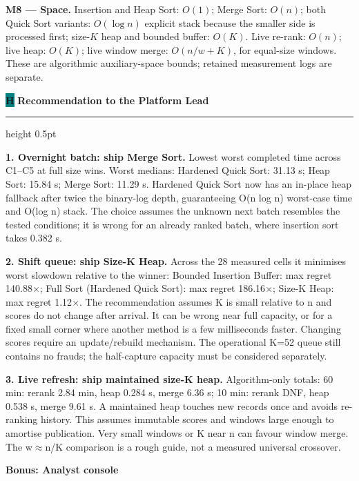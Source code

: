 \documentclass[10pt,a4paper]{article}
\newcommand{\sectiontitle}[2]{%
  \par\addvspace{4pt}%
  \noindent
  {\setlength{\fboxsep}{2.7pt}%
   \colorbox{teal}{\color{white}\fontsize{8.4}{9}\selectfont\bfseries #1}}%
  \hspace{5pt}%
  {\fontsize{12.2}{14}\selectfont\bfseries #2}%
  \par\vspace{1.6pt}%
  {\color{teal!40}\hrule height 0.5pt}%
  \par\vspace{2pt}%
}
\newcommand{\subheading}[1]{%
  \par\addvspace{3pt}%
  \noindent{\color{teal}\rule[-1.4pt]{2.6pt}{9pt}}\hspace{5pt}%
  {\fontsize{9.2}{11}\selectfont\bfseries #1}%
  \par\vspace{1pt}%
}
\begin{document}
\textbf{M8 --- Space.} Insertion and Heap Sort: \(O(1)\);
    Merge Sort: \(O(n)\); both Quick Sort variants: \(O(\log n)\) explicit
    stack because the smaller side is processed first; size-\(K\) heap and
    bounded buffer: \(O(K)\). Live re-rank: \(O(n)\);
    live heap: \(O(K)\); live window merge: \(O(n/w+K)\), for equal-size windows.
    These are algorithmic auxiliary-space bounds; retained measurement logs are separate.\par

\sectiontitle{H}{Recommendation to the Platform Lead}

\textbf{1. Overnight batch: ship Merge Sort.} Lowest worst completed time
across C1--C5 at full size wins. Worst medians: Hardened Quick Sort: 31.13 s;
Heap Sort: 15.84 s; Merge Sort: 11.29 s. Hardened Quick Sort now has an
in-place heap fallback after twice the binary-log depth, guaranteeing
O(n log n) worst-case time and O(log n) stack. The choice assumes the unknown
next batch resembles the tested conditions; it is wrong for an already ranked
batch, where insertion sort takes 0.382 s.\par

\textbf{2. Shift queue: ship Size-K Heap.} Across the 28 measured cells it
minimises worst slowdown relative to the winner: Bounded Insertion Buffer: max
regret 140.88$\times$; Full Sort (Hardened Quick Sort): max regret
186.16$\times$; Size-K Heap: max regret 1.12$\times$. The recommendation
assumes K is small relative to n and scores do not change after arrival. It can
be wrong near full capacity, or for a fixed small corner where another method
is a few milliseconds faster. Changing scores require an update/rebuild
mechanism. The operational K=52 queue still contains no frauds; the
half-capture capacity must be considered separately.\par

\textbf{3. Live refresh: ship maintained size-K heap.} Algorithm-only totals:
60 min: rerank 2.84 min, heap 0.284 s, merge 6.36 s; 10 min: rerank DNF, heap
0.538 s, merge 9.61 s. A maintained heap touches new records once and avoids
re-ranking history. This assumes immutable scores and windows large enough to
amortise publication. Very small windows or K near n can favour window merge.
The w\(\approx\)n/K comparison is a rough guide, not a measured universal
crossover.\par

\subheading{Bonus: Analyst console}
\end{document}
